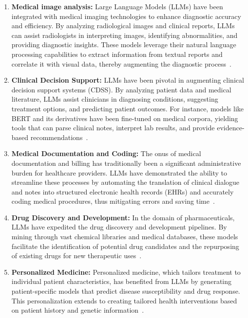 \begin{enumerate}
	\item \textbf{Medical image analysis:}{
		      Large Language Models (LLMs) have been integrated with medical imaging technologies to enhance diagnostic accuracy and efficiency.
		      By analyzing radiological images and clinical reports, LLMs can assist radiologists in interpreting images, identifying abnormalities, and providing diagnostic insights.
		      These models leverage their natural language processing capabilities to extract information from textual reports and correlate it with visual data, thereby augmenting the diagnostic process~\cite{li2021survey, zhang2021medical}.
	      }

	\item \textbf{Clinical Decision Support:}{
		      LLMs have been pivotal in augmenting clinical decision support systems (CDSS). By analyzing patient data and medical literature, LLMs assist clinicians in diagnosing conditions, suggesting treatment options, and predicting patient outcomes. For instance, models like BERT and its derivatives have been fine-tuned on medical corpora, yielding tools that can parse clinical notes, interpret lab results, and provide evidence-based recommendations~\cite{alsentzer2019publicly}.
	      }

	\item \textbf{Medical Documentation and Coding:}{
		      The onus of medical documentation and billing has traditionally been a significant administrative burden for healthcare providers. LLMs have demonstrated the ability to streamline these processes by automating the translation of clinical dialogue and notes into structured electronic health records (EHRs) and accurately coding medical procedures, thus mitigating errors and saving time~\cite{shickel2018deep}.
	      }

	\item \textbf{Drug Discovery and Development:}{
		      In the domain of pharmaceuticals, LLMs have expedited the drug discovery and development pipelines. By mining through vast chemical libraries and medical databases, these models facilitate the identification of potential drug candidates and the repurposing of existing drugs for new therapeutic uses~\cite{zhavoronkov2019deep}.
	      }

	\item \textbf{Personalized Medicine:}{
		      Personalized medicine, which tailors treatment to individual patient characteristics, has benefited from LLMs by generating patient-specific models that predict disease susceptibility and drug response. This personalization extends to creating tailored health interventions based on patient history and genetic information~\cite{hamburg2010path}.
	      }


\end{enumerate}
